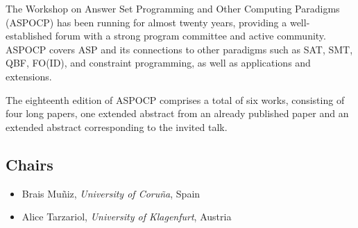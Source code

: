 \documentclass[
]{ceurart}
\begin{document}

\noindent
The Workshop on Answer Set Programming and Other Computing Paradigms (ASPOCP) has been running for almost twenty years, providing a well-established forum with a strong program committee and active community. ASPOCP covers ASP and its connections to other paradigms such as SAT, SMT, QBF, FO(ID), and constraint programming, as well as applications and extensions.

The eighteenth edition of ASPOCP comprises a total of six works, consisting of four long papers, one extended abstract from an already published paper and an extended abstract corresponding to the invited talk.

\subsection*{Chairs}
\begin{itemize}
 \item Brais Muñiz, \emph{University of Coru\~na}, Spain
 \item Alice Tarzariol, \emph{University of Klagenfurt}, Austria
\end{itemize}
\end{document}
